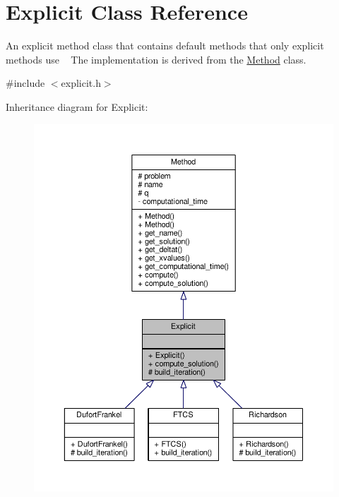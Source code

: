 \hypertarget{classExplicit}{}\section{Explicit Class Reference}
\label{classExplicit}


An explicit method class that contains default methods that only explicit methods use ~\newline
 The implementation is derived from the \hyperlink{classMethod}{Method} class.  




{\ttfamily \#include $<$explicit.\+h$>$}



Inheritance diagram for Explicit\+:
\nopagebreak
\begin{figure}[H]
\begin{center}
\leavevmode
\includegraphics[width=350pt]{classExplicit__inherit__graph}
\end{center}
\end{figure}


